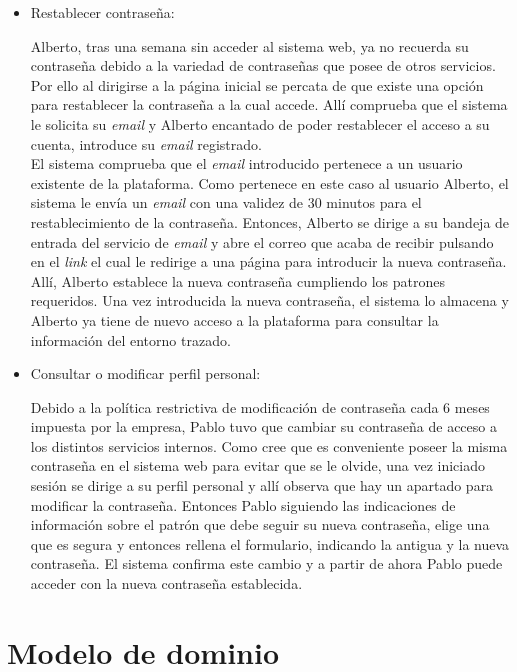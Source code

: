 \documentclass[12pt,a4paper, twoside]{report}
\begin{document}
\begin{itemize}
		\item Restablecer contraseña:
		
		Alberto, tras una semana sin acceder al sistema web, ya no recuerda su contraseña debido a la variedad de contraseñas que posee de otros servicios. Por ello al dirigirse a la página inicial se percata de que existe una opción para restablecer la contraseña a la cual accede. Allí comprueba que el sistema le solicita su \textit{email} y Alberto encantado de poder restablecer el acceso a su cuenta, introduce su \textit{email} registrado. \\
		
		El sistema comprueba que el \textit{email} introducido pertenece a un usuario existente de la plataforma. Como pertenece en este caso al usuario Alberto, el sistema le envía un \textit{email} con una validez de 30 minutos para el restablecimiento de la contraseña. Entonces, Alberto se dirige a su bandeja de entrada del servicio de \textit{email} y abre el correo que acaba de recibir pulsando en el \textit{link} el cual le redirige a una página para introducir la nueva contraseña. Allí, Alberto establece la nueva contraseña cumpliendo los patrones requeridos. Una vez introducida la nueva contraseña, el sistema lo almacena y Alberto ya tiene de nuevo acceso a la plataforma para consultar la información del entorno trazado.
				
		\item Consultar o modificar perfil personal:
		
		Debido a la política restrictiva de modificación de contraseña cada 6 meses impuesta por la empresa, Pablo tuvo que cambiar su contraseña de acceso a los distintos servicios internos. Como cree que es conveniente poseer la misma contraseña en el sistema web para evitar que se le olvide, una vez iniciado sesión se dirige a su perfil personal y allí observa que hay un apartado para modificar la contraseña. Entonces Pablo siguiendo las indicaciones de información sobre el patrón que debe seguir su nueva contraseña, elige una que es segura y entonces rellena el formulario, indicando la antigua y la nueva contraseña. El sistema confirma este cambio y a partir de ahora Pablo puede acceder con la nueva contraseña establecida.
				
	\end{itemize}
	
	\section{Modelo de dominio}
		
\end{document}
